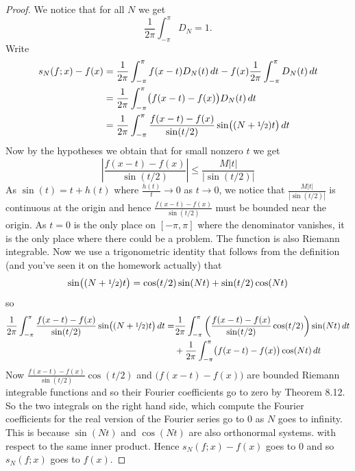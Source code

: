 \documentclass[12pt]{book}
\newcommand{\abs}[1]{\left\lvert {#1} \right\rvert}
\theoremstyle{plain}
\theoremstyle{remark}
\theoremstyle{definition}
\theoremstyle{exercise}
\theoremstyle{example}
\begin{document}
\medskip

\begin{proof}
We notice that for all $N$ we get
\begin{equation*}
\frac{1}{2\pi} \int_{-\pi}^\pi D_N = 1 .
\end{equation*}
Write
\begin{equation*}
\begin{split}
s_N(f;x)-f(x) & =
\frac{1}{2\pi} \int_{-\pi}^\pi f(x-t) D_N(t) \, dt 
-
f(x)
\frac{1}{2\pi} \int_{-\pi}^\pi D_N(t) \, dt
\\
& = 
\frac{1}{2\pi} \int_{-\pi}^\pi \bigl( f(x-t) - f(x) \bigr) D_N(t) \, dt 
\\
& = 
\frac{1}{2\pi} \int_{-\pi}^\pi \frac{f(x-t) - f(x)}{\sin(t/2)} \sin\bigl(
(N+\nicefrac{1}{2})t \bigr) \, dt 
\end{split}
\end{equation*}
Now by the hypotheses we obtain that
for small nonzero $t$ we get
\begin{equation*}
\abs{ \frac{f(x-t) - f(x)}{\sin(t/2)} }
\leq
\frac{M\abs{t}}{\abs{\sin(t/2)}}
\end{equation*}
As $\sin(t) = t + h(t)$ where $\frac{h(t)}{t} \to 0$ as $t \to 0$,
we notice that
$\frac{M\abs{t}}{\abs{\sin(t/2)}}$ is continuous at the origin
and hence 
$\frac{f(x-t) - f(x)}{\sin(t/2)}$ must be bounded near the origin.
As $t=0$ is the only place on $[-\pi,\pi]$ where the denominator vanishes,
it is the only place where there could be a problem.  The function is
also Riemann integrable.  Now we use a trigonometric identity
that follows from the definition (and you've seen it on the homework
actually) that 
$$
\sin\bigl( (N+\nicefrac{1}{2})t \bigr)
=
\cos(t/2) \sin(Nt) + 
\sin(t/2) \cos(Nt)
$$
so
\begin{equation*}
\begin{split}
\frac{1}{2\pi} \int_{-\pi}^\pi \frac{f(x-t) - f(x)}{\sin(t/2)} \sin\bigl(
(N+\nicefrac{1}{2})t \bigr) \, dt 
=
&
\frac{1}{2\pi} \int_{-\pi}^\pi
\left( \frac{f(x-t) - f(x)}{\sin(t/2)}
\cos (t/2) \right) \sin (Nt) \, dt
\\
& +
\frac{1}{2\pi} \int_{-\pi}^\pi \bigl( f(x-t) - f(x) \bigr)
\cos (Nt) \, dt
\end{split}
\end{equation*}
Now 
$\frac{f(x-t) - f(x)}{\sin(t/2)} \cos (t/2)$
and
$\bigl( f(x-t) - f(x) \bigr)$ are bounded Riemann integrable functions
and so their Fourier coefficients go to zero by Theorem 8.12.  So the two
integrals on the right hand side, which compute the Fourier coefficients
for the real version of the Fourier series go to 0 as $N$ goes to infinity.
This is because $\sin(Nt)$ and $\cos(Nt)$ are also orthonormal systems.
with respect to the same inner product.
Hence $s_N(f;x)-f(x)$ goes to 0 and so $s_N(f;x)$ goes to $f(x)$.
\end{proof}
\end{document}
